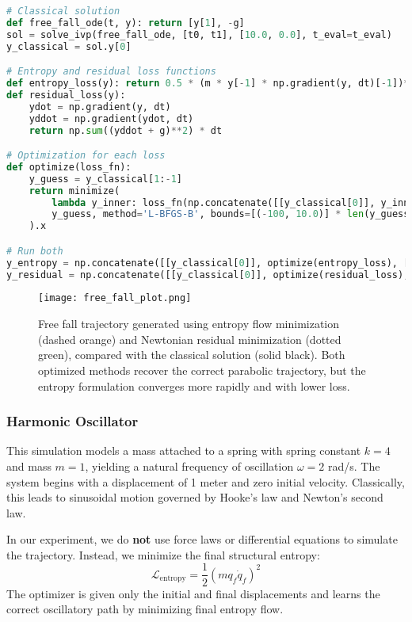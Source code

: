 \documentclass[12pt]{article}
\begin{document}
\begin{lstlisting}[language=Python]
# Classical solution
def free_fall_ode(t, y): return [y[1], -g]
sol = solve_ivp(free_fall_ode, [t0, t1], [10.0, 0.0], t_eval=t_eval)
y_classical = sol.y[0]

# Entropy and residual loss functions
def entropy_loss(y): return 0.5 * (m * y[-1] * np.gradient(y, dt)[-1])**2
def residual_loss(y):
    ydot = np.gradient(y, dt)
    yddot = np.gradient(ydot, dt)
    return np.sum((yddot + g)**2) * dt

# Optimization for each loss
def optimize(loss_fn): 
    y_guess = y_classical[1:-1]
    return minimize(
        lambda y_inner: loss_fn(np.concatenate([[y_classical[0]], y_inner, [y_classical[-1]]])),
        y_guess, method='L-BFGS-B', bounds=[(-100, 10.0)] * len(y_guess)
    ).x

# Run both
y_entropy = np.concatenate([[y_classical[0]], optimize(entropy_loss), [y_classical[-1]]])
y_residual = np.concatenate([[y_classical[0]], optimize(residual_loss), [y_classical[-1]]])
\end{lstlisting}

\begin{figure}[H]
\centering
\texttt{[image: free\_fall\_plot.png]}
\caption{
Free fall trajectory generated using entropy flow minimization (dashed orange) and Newtonian residual minimization (dotted green), compared with the classical solution (solid black). Both optimized methods recover the correct parabolic trajectory, but the entropy formulation converges more rapidly and with lower loss.
}
\end{figure}


\subsubsection{Harmonic Oscillator}

This simulation models a mass attached to a spring with spring constant \( k = 4 \) and mass \( m = 1 \), yielding a natural frequency of oscillation \( \omega = 2 \) rad/s. The system begins with a displacement of 1 meter and zero initial velocity. Classically, this leads to sinusoidal motion governed by Hooke’s law and Newton's second law.

In our experiment, we do \textbf{not} use force laws or differential equations to simulate the trajectory. Instead, we minimize the final structural entropy:
\[
\mathcal{L}_{\text{entropy}} = \frac{1}{2} (m q_f \dot{q}_f)^2
\]
The optimizer is given only the initial and final displacements and learns the correct oscillatory path by minimizing final entropy flow.
\end{document}
